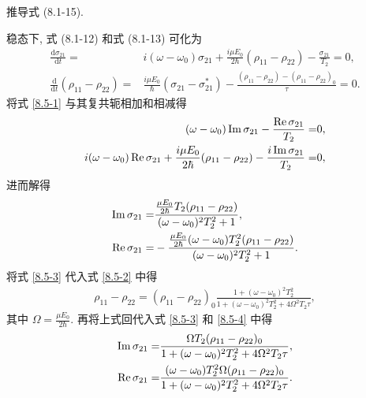 \documentclass{note}
\begin{document}
\begin{exe}
    推导式 (8.1-15).
\end{exe}
\begin{pf}
    稳态下, 式 (8.1-12) 和式 (8.1-13) 可化为
    \begin{align}
        \label{8.5-1}
        \frac{\mathrm{d}\sigma_{21}}{\mathrm{d}t}=&i(\omega-\omega_0)\sigma_{21}+\frac{i\mu E_0}{2\hbar}(\rho_{11}-\rho_{22})-\frac{\sigma_{21}}{T_2}=0,\\
        \label{8.5-2}
        \frac{\mathrm{d}}{\mathrm{d}t}(\rho_{11}-\rho_{22})=&\frac{i\mu E_0}{\hbar}(\sigma_{21}-\sigma_{21}^*)-\frac{(\rho_{11}-\rho_{22})-(\rho_{11}-\rho_{22})_0}{\tau}=0.
    \end{align}
    将式 \eqref{8.5-1} 与其复共轭相加和相减得
    \begin{align}
        (\omega-\omega_0)\operatorname{Im}\sigma_{21}-\frac{\operatorname{Re}\sigma_{21}}{T_2}=&0,\\
        i(\omega-\omega_0)\operatorname{Re}\sigma_{21}+\frac{i\mu E_0}{2\hbar}(\rho_{11}-\rho_{22})-\frac{i\operatorname{Im}\sigma_{21}}{T_2}=&0,
    \end{align}
    进而解得
    \begin{align}
        \label{8.5-3}
        \operatorname{Im}\sigma_{21}=&\frac{\frac{\mu E_0}{2\hbar}T_2(\rho_{11}-\rho_{22})}{(\omega-\omega_0)^2T_2^2+1},\\
        \label{8.5-4}
        \operatorname{Re}\sigma_{21}=&-\frac{\frac{\mu E_0}{2\hbar}(\omega-\omega_0)T_2^2(\rho_{11}-\rho_{22})}{(\omega-\omega_0)^2T_2^2+1}.
    \end{align}
    将式 \eqref{8.5-3} 代入式 \eqref{8.5-2} 中得
    \begin{align}
        \rho_{11}-\rho_{22}=(\rho_{11}-\rho_{22})_0\frac{1+(\omega-\omega_0)^2T_2^2}{1+(\omega-\omega_0)^2T_2^2+4\Omega^2T_2\tau},
    \end{align}
    其中 $\Omega=\frac{\mu E_0}{2\hbar}$.
    再将上式回代入式 \eqref{8.5-3} 和 \eqref{8.5-4} 中得
    \begin{align}
        \operatorname{Im}\sigma_{21}=&\frac{\Omega T_2(\rho_{11}-\rho_{22})_0}{1+(\omega-\omega_0)^2T_2^2+4\Omega^2T_2\tau},\\
        \operatorname{Re}\sigma_{21}=&\frac{(\omega-\omega_0)T_2^2\Omega(\rho_{11}-\rho_{22})_0}{1+(\omega-\omega_0)^2T_2^2+4\Omega^2T_2\tau}.
    \end{align}
\end{pf}
\end{document}
